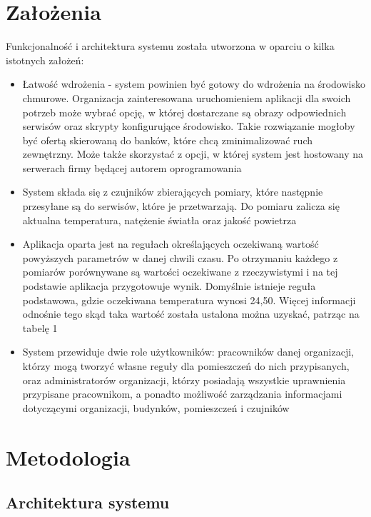 \documentclass[11pt]{article} %
\begin{document}
\section{Założenia}
Funkcjonalność i architektura systemu została utworzona w oparciu o kilka istotnych 
założeń:

\begin{itemize} %
    \item Łatwość wdrożenia - system powinien być gotowy do wdrożenia na środowisko 
    chmurowe. Organizacja zainteresowana uruchomieniem aplikacji dla swoich potrzeb 
    może wybrać opcję, w której dostarczane są obrazy odpowiednich serwisów oraz 
    skrypty konfigurujące środowisko. Takie rozwiązanie mogłoby być ofertą skierowaną 
    do banków, które chcą zminimalizować ruch zewnętrzny. Może także skorzystać z 
    opcji, w której system jest hostowany na serwerach firmy będącej autorem 
    oprogramowania
    \item System składa się z czujników zbierających pomiary, które następnie przesyłane 
    są do serwisów, które je przetwarzają. Do pomiaru zalicza się aktualna 
    temperatura, natężenie światła oraz jakość powietrza
    \item Aplikacja oparta jest na regułach określających oczekiwaną wartość powyższych 
    parametrów w danej chwili czasu. Po otrzymaniu każdego z pomiarów porównywane są 
    wartości oczekiwane z rzeczywistymi i na tej podstawie aplikacja przygotowuje wynik. 
    Domyślnie istnieje reguła podstawowa, gdzie oczekiwana temperatura wynosi 24,50. 
    Więcej informacji odnośnie tego skąd taka wartość została ustalona można 
    uzyskać, patrząc na tabelę 1
    \item System przewiduje dwie role użytkowników: pracowników danej 
    organizacji, którzy mogą tworzyć własne reguły dla pomieszczeń do nich 
    przypisanych, oraz administratorów organizacji, którzy posiadają wszystkie 
    uprawnienia przypisane pracownikom, a ponadto możliwość zarządzania informacjami 
    dotyczącymi organizacji, budynków, pomieszczeń i czujników
\end{itemize}

\section{Metodologia}
\subsection{Architektura systemu}
\end{document}
